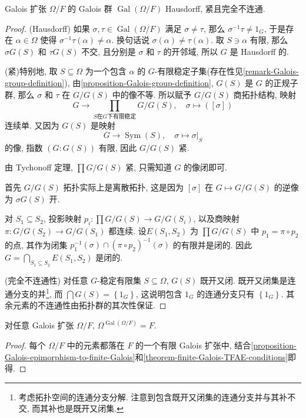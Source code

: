 \begin{proposition}
  Galois 扩张 \( \Omega/F \) 的 Galois 群 \( \operatorname{Gal}(\Omega/F) \)
  Hausdorff, 紧且完全不连通.
\end{proposition}
\begin{proof}
  (Hausdorff)
  如果 \( \sigma, \tau \in \operatorname{Gal}(\Omega/F) \) 满足 \( \sigma \neq
  \tau \), 那么 \( \sigma^{-1}\tau \neq 1_G \), 于是存在 \( \alpha \in \Omega
  \) 使得 \( \sigma^{-1}\tau(\alpha) \neq \alpha \).
  换句话说 \( \sigma(\alpha) \neq \tau(\alpha) \).
  取 \( S \ni \alpha \) 有限, 那么 \( \sigma G(S) \) 和 \( \tau G(S) \) 不交,
  且分别是 \( \sigma \) 和 \( \tau \) 的开邻域, 所以 \( G \) 是 Hausdorff 的.

  (紧)特别地, 取 \( S \subseteq \Omega \) 为一个包含 \( \alpha \) 的 \( G
  \)-有限稳定子集(存在性见\cref{remark-Galois-group-definition}),
  由\cref{proposition-Galois-group-definition}, \( G(S) \) 是 \( G \)
  的正规子群, 那么 \( \sigma \) 和 \( \tau \) 在 \( G / G(S) \) 中的像不等.
  所以赋予 \( G/G(S) \) 商拓扑结构, 映射
  \[
    G \to \prod_{S \text{在} G \text{下有限稳定}} G/G(S),\quad \sigma \mapsto ([\sigma])
  \]
  连续单.
  又因为 \( G(S) \) 是映射
  \[
    G \to \operatorname{Sym}(S),\quad \sigma \mapsto \left. \sigma
      \right\vert_{S}
  \]
  的像, 指数 \( (G: G(S)) \) 有限, 因此 \( G/G(S) \) 紧.

  由 Tychonoff 定理, \( \prod G/G(S) \) 紧, 只需知道 \( G \) 的像闭即可.
  
  首先 \( G/G(S) \) 拓扑实际上是离散拓扑, 这是因为 \( [\sigma] \) 在 \( G
  \mapsto G/G(S) \) 的逆像为 \( \sigma G(S) \) 开.

  对 \( S_1 \subseteq S_2 \), 投影映射 \( p_i: \prod G/G(S) \to G/G(S_i) \),
  以及商映射 \( \pi: G/G(S_2) \to G/G(S_1) \) 都连续.
  设\( E(S_1, S_2) \) 为 \( \prod G/G(S) \) 中 \( p_1 = \pi \circ p_2 \)
  的点, 其作为闭集 \( p_1^{-1}(\sigma) \cap
  (\pi \circ p_2)^{-1}(\sigma) \) 的有限并是闭的.
  因此 \( G = \bigcap_{S_1 \subseteq S_2} E(S_1, S_2) \) 是闭的.

  (完全不连通性) 对任意 \( G \)-稳定有限集 \( S \subseteq \Omega \), \( G(S) \)
  既开又闭.
  既开又闭集是连通分支的并\footnote{考虑拓扑空间的连通分支分解.
  注意到包含既开又闭集的连通分支并与其补不交, 而其补也是既开又闭集.}, 而 \(
  \bigcap G(S) = \left\lbrace 1_G \right\rbrace \), 这说明包含 \( 1_G \)
  的连通分支只有 \( \left\lbrace 1_G \right\rbrace \).
  其余元素的不连通性由拓扑群的其次性保证.
\end{proof}

\begin{proposition}
  \label{proposition-Galois-stable-field}
  对任意 Galois 扩张 \( \Omega/F \), \( \Omega^{\operatorname{Gal}(\Omega/F)} =
  F \).
\end{proposition}
\begin{proof}
  每个 \( \Omega / F \) 中的元素都落在 \( F \) 的一个有限 Galois 扩张中,
  结合\cref{proposition-Galois-epimorphism-to-finite-Galois}和\cref{theorem-finite-Galois-TFAE-conditions}即得.
\end{proof}

